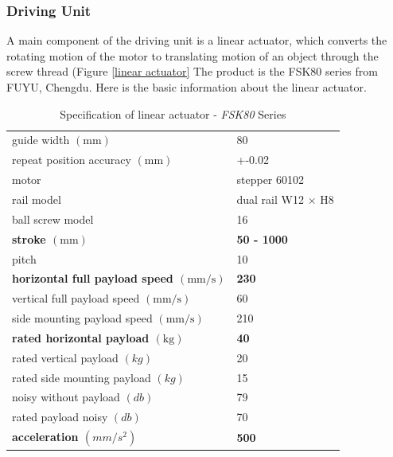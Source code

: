 \subsubsection{Driving Unit}

A main component of the driving unit is a linear actuator, which converts the rotating motion of the motor to translating motion of an object through the screw thread (Figure \ref{linear actuator} The product is the FSK80 series from FUYU, Chengdu. Here is the basic information about the linear actuator.

\begin{table}[H]
    \centering
    \captionsetup{justification=centering}
    \begin{tabular}{l|l}
        \hline
        guide width $(\mathrm{mm})$                       & 80                                     \\
        repeat position accuracy $(\mathrm{mm})$          & +-0.02                                 \\
        motor                                  & stepper 60102                          \\
        rail model                             & dual rail W12 $\times$ H8              \\
        ball screw model                       & 16                                     \\
        \textbf{stroke $(\mathrm{mm})$}                  & \textbf{50 - 1000}                                    \\
        pitch                                  & 10                                     \\
        \textbf{horizontal full payload speed $(\mathrm{mm/s})$}   & \textbf{230}                                    \\
        vertical full payload speed $\mathrm{(mm/s)}$     & 60                                     \\
        side mounting payload speed $\mathrm{(mm/s)}$     & 210                                    \\
        \textbf{rated horizontal payload $\mathrm{(kg)}$}          & \textbf{40}                                     \\
        rated vertical payload $(kg)$            & 20                                     \\
        rated side mounting payload $(kg)$       & 15                                     \\
        noisy without payload $(db)$             & 79                                     \\
        rated payload noisy $(db)$               & 70                                     \\
        \textbf{acceleration $(mm/s^{2})$} & \textbf{500}                                    \\ \hline
    \end{tabular}%
    \caption{Specification of linear actuator - \textit{FSK80} Series}
    \label{specifiacion of linear actuator}
\end{table}

